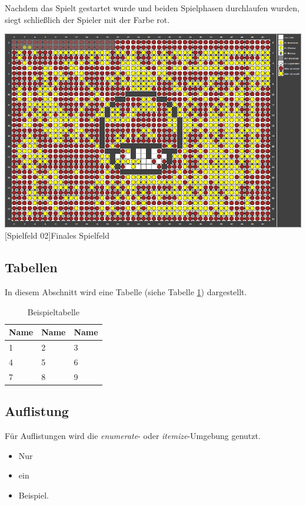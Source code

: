 \documentclass[12pt,a4paper,bibliography=totocnumbered,listof=totocnumbered]{scrartcl}
\begin{document}
Nachdem das Spielt gestartet wurde und beiden Spielphasen durchlaufen wurden, siegt schließlich der Spieler mit der Farbe rot.

\vspace{1em}
\begin{minipage}{\linewidth}
	\centering
	\includegraphics[width=0.6\linewidth]{pics/gamefield02.png}
	[Spielfeld 02]{Finales Spielfeld\footnotemark }
	\label{fig:reversi2}
\end{minipage}

\subsection{Tabellen}
In diesem Abschnitt wird eine Tabelle (siehe Tabelle \ref{tab:beispiel}) dargestellt.

\vspace{1em}
\begin{table}[!h]
	\centering
	\begin{tabular}{|l|l|l|}
		\hline
		\textbf{Name} & \textbf{Name} & \textbf{Name}\\
		\hline
		1 & 2 & 3\\
		\hline
		4 & 5 & 6\\
		\hline
		7 & 8 & 9\\
		\hline
	\end{tabular}
	\caption{Beispieltabelle}
	\label{tab:beispiel}
\end{table}


\subsection{Auflistung}
Für Auflistungen wird die \textit{enumerate}- oder \textit{itemize}-Umgebung genutzt.

\begin{itemize}
	\item Nur
	\item ein
	\item Beispiel.
\end{itemize}
\end{document}
